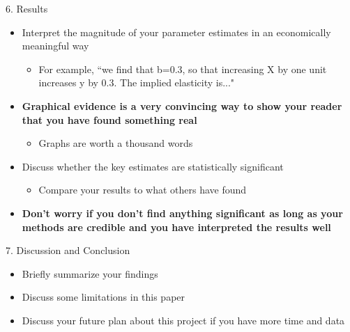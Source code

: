 \documentclass[dvipsnames,hyperref={pdfpagelabels=false}]{beamer}
\begin{document}
\begin{frame}{6. Results}
	\begin{itemize} 
		
		\item Interpret the magnitude of your parameter estimates in an economically meaningful way
		\vspace{0.2cm}
		\begin{itemize} 
			\item For example, ``we find that b=0.3, so that increasing X by
			one unit increases y by 0.3. The implied elasticity is..."
		\end{itemize}
		\vspace{0.2cm} 
		
		\item \textbf{Graphical evidence is a very convincing way to show your reader that you have found something real}
		\begin{itemize} 
			\vspace{0.2cm}
			\item Graphs are worth a thousand words
		\end{itemize}
		\vspace{0.2cm}
		\item Discuss whether the key estimates are statistically significant
		\vspace{0.2cm}
		\begin{itemize} 
			\item Compare your results to what others have found
			\vspace{0.2cm}
		\end{itemize}
		\item \textbf{Don't worry if you don't find anything significant as long as your methods are credible and you have interpreted the results well}
		
	\end{itemize}
	
\end{frame}







\begin{frame}{7. Discussion and Conclusion }
	\begin{itemize} 
		
		\item Briefly summarize your findings
		\vspace{0.2cm}
		\item Discuss some limitations in this paper 
		\vspace{0.2cm}
		\item Discuss your future plan about this project if you have more time and data
	\end{itemize}
	
\end{frame}
\end{document}
